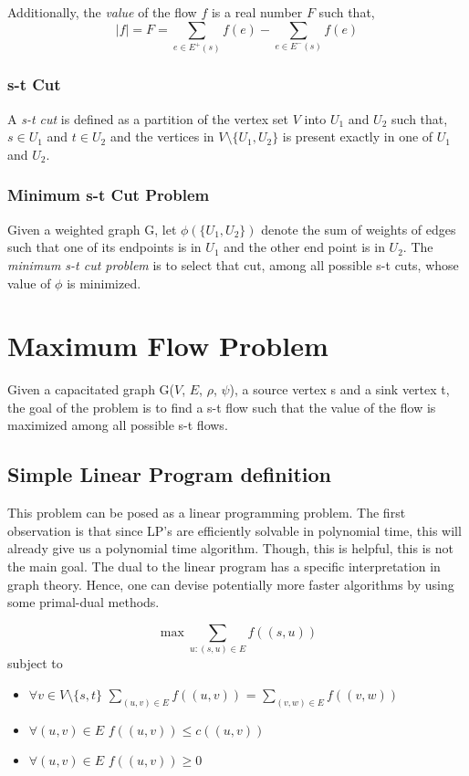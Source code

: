 \documentclass[BTech]{iitmdiss}
\begin{document}
	Additionally, the \textit{value} of the flow $f$ is a real number $F$ such that,
	$$|f| = F = \displaystyle\sum_{e \in E^+(s)} f(e)- \displaystyle\sum_{e \in E^-(s)} f(e)$$
	
      \subsubsection{s-t Cut}
	A \textit{s-t cut} is defined as a partition of the vertex set $V$ into $U_1$ and $U_2$ such that, $s \in U_1$ and $t \in U_2$ and the vertices
	in $V \setminus \{U_1, U_2 \}$ is present exactly in one of $U_1$ and $U_2$.
      
      \subsubsection{Minimum s-t Cut Problem}
	Given a weighted graph G, let $\phi(\{U_1,U_2\})$ denote the sum of weights of edges such that one of its endpoints is in $U_1$ and the other
	end point is in $U_2$. The \textit{minimum s-t cut problem} is to select that cut, among all possible s-t cuts, whose value of $\phi$ is minimized.
      \section{Maximum Flow Problem}
	Given a capacitated graph G($V$, $E$, $\rho$, $\psi$), a source vertex s and a sink vertex t, the goal of the problem is to find a s-t flow
	such that the value of the flow is maximized among all possible s-t flows. \\
	
	\subsection{Simple Linear Program definition}
	  This problem can be posed as a linear programming problem. The first observation is that since LP's are efficiently solvable in polynomial
	  time, this will already give us a polynomial time algorithm. Though, this is helpful, this is not the main goal. The dual to the linear
	  program has a specific interpretation in graph theory. Hence, one can devise potentially more faster algorithms by using some primal-dual
	  methods.
	  
	  $$\max \displaystyle\sum_{u:(s,u) \in E} f((s,u))$$
	  subject to
	  \begin{itemize}
	   \item
	      $\forall v \in V \setminus \{s,t\}$ $\displaystyle\sum_{(u,v) \in E} f((u,v))$ = $\displaystyle\sum_{(v,w) \in E} f((v,w))$
	   \item
	      $\forall (u,v) \in E$ $f((u,v)) \leq c((u,v))$
	   \item
	      $\forall(u,v) \in E$ $f((u,v)) \geq 0$
	      
	  \end{itemize}
	  
\end{document}
